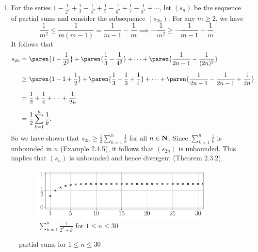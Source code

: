 \documentclass{lew98_solutions}
\begin{document}
\begin{solution}
\begin{enumerate}
        \item For the series \( 1 - \tfrac{1}{2^2} + \tfrac{1}{3} - \tfrac{1}{4^2} + \tfrac{1}{5} - \tfrac{1}{6^2} + \tfrac{1}{7} - \tfrac{1}{8^2} + \cdots \), let \( (s_n) \) be the sequence of partial sums and consider the subsequence \( (s_{2n}) \). For any \( m \geq 2 \), we have
        \[
            \frac{1}{m^2} \leq \frac{1}{m(m-1)} = \frac{1}{m-1} - \frac{1}{m} \implies -\frac{1}{m^2} \geq - \frac{1}{m-1} + \frac{1}{m}.
        \]
        It follows that
        \begin{align*}
            s_{2n} = \,\, & \paren{ 1 - \frac{1}{2^2} } + \paren{ \frac{1}{3} - \frac{1}{4^2} } + \cdots + \paren{ \frac{1}{2n - 1} - \frac{1}{(2n)^2} } \\[2mm]
            \geq \,\, & \paren{ 1 - 1 + \frac{1}{2} } + \paren{ \frac{1}{3} - \frac{1}{3} + \frac{1}{4} } + \cdots + \paren{ \frac{1}{2n-1} - \frac{1}{2n-1} + \frac{1}{2n} } \\[2mm]
            = \,\, & \frac{1}{2} + \frac{1}{4} + \cdots + \frac{1}{2n} \\[2mm]
            = \,\, & \frac{1}{2} \sum_{k=1}^n \frac{1}{k}.
        \end{align*}
        So we have shown that \( s_{2n} \geq \tfrac{1}{2} \sum_{k=1}^n \tfrac{1}{k} \) for all \( n \in \mathbf{N} \). Since \( \sum_{k=1}^n \tfrac{1}{k} \) is unbounded in \( n \) (Example 2.4.5), it follows that \( (s_{2n}) \) is unbounded. This implies that \( (s_n) \) is unbounded and hence divergent (Theorem 2.3.2).
    \end{enumerate}
    \begin{figure}[H]
        \centering
        \begin{subfigure}{0.85\textwidth}
            \includegraphics[width=\textwidth]{UA_Figures/UA_ex2_7_2_fig_a.pdf}
            \caption{\( \sum_{k=1}^n \tfrac{1}{2^k + k} \) for \( 1 \leq n \leq 30 \)}
        \end{subfigure}
        \caption{ partial sums for \( 1 \leq n \leq 30 \)}
    \end{figure}


\end{solution}
\end{document}
